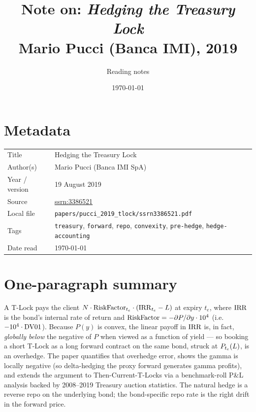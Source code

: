 \documentclass[11pt,a4paper]{article}
\title{Note on: \emph{Hedging the Treasury Lock}\\
       \large Mario Pucci (Banca IMI), 2019}
\author{Reading notes}
\date{\today}
\begin{document}
\maketitle

\section*{Metadata}
\begin{tabular}{@{}p{3.5cm}p{11cm}@{}}
\toprule
Title           & Hedging the Treasury Lock \\
Author(s)       & Mario Pucci (Banca IMI SpA) \\
Year / version  & 19 August 2019 \\
Source          & \href{https://ssrn.com/abstract=3386521}{ssrn:3386521} \\
Local file      & \texttt{papers/pucci\_2019\_tlock/ssrn3386521.pdf} \\
Tags            & \texttt{treasury}, \texttt{forward}, \texttt{repo},
                  \texttt{convexity}, \texttt{pre-hedge}, \texttt{hedge-accounting} \\
Date read       & \today \\
\bottomrule
\end{tabular}

\section*{One-paragraph summary}
A T-Lock pays the client $N \cdot \mathrm{RiskFactor}_{t_e} \cdot (\mathrm{IRR}_{t_e} - L)$
at expiry $t_e$, where $\mathrm{IRR}$ is the bond's internal rate of return and
$\mathrm{RiskFactor} = -\partial P/\partial y \cdot 10^4$ (i.e.\ $-10^4 \cdot \mathrm{DV01}$).
Because $P(y)$ is convex, the linear payoff in $\mathrm{IRR}$ is, in fact,
\emph{globally below} the negative of $P$ when viewed as a function of
yield --- so booking a short T-Lock as a long forward contract on the
same bond, struck at $P_{t_e}(L)$, is an overhedge. The paper
quantifies that overhedge error, shows the gamma is locally negative
(so delta-hedging the proxy forward generates gamma profits), and
extends the argument to Then-Current-T-Locks via a benchmark-roll P\&L
analysis backed by 2008--2019 Treasury auction statistics. The natural
hedge is a reverse repo on the underlying bond; the bond-specific repo
rate is the right drift in the forward price.
\end{document}
